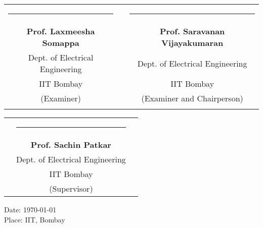\begin{Approval}
\begin{center}
\begin{tabular}{ccc}
    \rule{6cm}{1sp}    & \rule{10mm}{0pt} & \rule{6cm}{1sp} \\
    {\bf{  Prof.  Laxmeesha Somappa}}        &    & {\bf{  Prof. Saravanan Vijayakumaran}} \\  
    { Dept. of Electrical Engineering}      &    & { Dept. of Electrical Engineering}\\
    { IIT Bombay}      &    & { IIT Bombay}\\
    {(Examiner)}        &    & {(Examiner and Chairperson)} \\[0.4in]\\
    \end{tabular}
    \begin{tabular}{ccc}
    \rule{10mm}{0pt} &\rule{6cm}{1sp} &\rule{10mm}{0pt} \\
    &{\bf{ Prof. Sachin Patkar}}    & \\  
    &{ Dept. of Electrical Engineering}    & \\
    &{ IIT Bombay}    & \\
    &{(Supervisor)} & \\[0.4in]
    \end{tabular}
\end{center}

\begin{flushleft}
Date: \today \\
Place: IIT, Bombay
\end{flushleft}

\end{Approval}